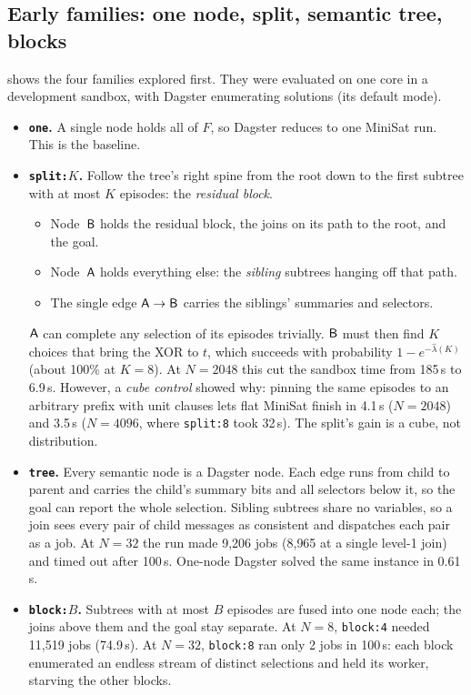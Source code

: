 \documentclass[11pt,a4paper]{article}
\newcommand{\dfam}[1]{\texttt{#1}}
\begin{document}
\subsection{Early families: one node, split, semantic tree, blocks}
\label{sec:early}
 shows the four families explored first. They were evaluated on one core
in a development sandbox, with Dagster enumerating solutions (its default mode).

\begin{itemize}
\item \textbf{\dfam{one}.} A single node holds all of $F$, so Dagster reduces to one
      MiniSat run. This is the baseline.

\item \textbf{\dfam{split:$K$}.} Follow the tree's right spine from the root down to the
      first subtree with at most $K$ episodes: the \emph{residual block}.
      \begin{itemize}
      \item Node~$\mathsf{B}$ holds the residual block, the joins on its path to the root, and the
            goal.
      \item Node~$\mathsf{A}$ holds everything else: the \emph{sibling} subtrees hanging off that
            path.
      \item The single edge $\mathsf{A}\to\mathsf{B}$ carries the siblings' summaries and selectors.
      \end{itemize}
      $\mathsf{A}$ can complete any selection of its episodes trivially. $\mathsf{B}$ must then find $K$
      choices that bring the XOR to $t$, which succeeds with probability
      $1-e^{-\widehat{\lambda}(K)}$ (about 100\% at $K=8$). At $N=2048$ this cut the sandbox time from
      185\,s to 6.9\,s. However, a \emph{cube control} showed why: pinning the same episodes
      to an arbitrary prefix with unit clauses lets flat MiniSat finish in 4.1\,s ($N=2048$)
      and 3.5\,s ($N=4096$, where \dfam{split:8} took 32\,s). The split's gain is a cube,
      not distribution.

\item \textbf{\dfam{tree}.} Every semantic node is a Dagster node. Each edge runs from child
      to parent and carries the child's summary bits and all selectors below it, so the
      goal can report the whole selection. Sibling subtrees share no variables, so a join
      sees every pair of child messages as consistent and dispatches each pair as a job. At
      $N=32$ the run made 9{,}206 jobs (8{,}965 at a single level-1 join) and timed out
      after 100\,s. One-node Dagster solved the same instance in 0.61\,s.

\item \textbf{\dfam{block:$B$}.} Subtrees with at most $B$ episodes are fused into one node
      each; the joins above them and the goal stay separate. At $N=8$, \dfam{block:4} needed
      11{,}519 jobs (74.9\,s). At $N=32$, \dfam{block:8} ran only 2 jobs in 100\,s: each
      block enumerated an endless stream of distinct selections and held its worker,
      starving the other blocks.
\end{itemize}
\end{document}
